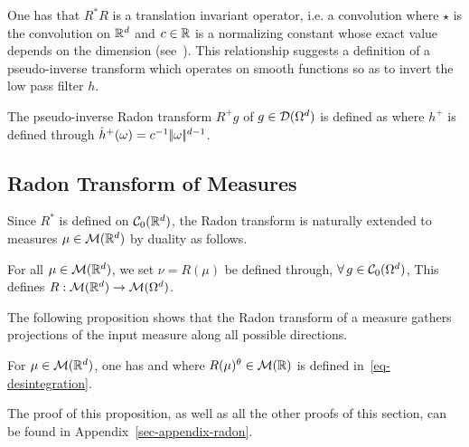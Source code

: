 \newcommand{\filt}{h}

One has that $R^* R$ is a translation invariant operator, i.e. a convolution  
\eq{
	R^*R f = \filt \star f
	\qwhereq
	\hat\filt(\om) = c \, \norm{\om}^{-(d-1)},
}
where $\star$ is the convolution on $\mathbb{R}^d$ and $c \in \mathbb{R}$ is a normalizing constant whose exact value depends on the dimension (see~\cite{Helgason-radonbook}). This relationship suggests a definition of a pseudo-inverse transform which operates on smooth functions so as to invert the low pass filter $\filt$.

\begin{defn} 
The pseudo-inverse Radon transform $R^+ g$ of $g \in \mathcal{D}(\Omega^d)$ is defined as
\eql{\label{eq-pseudo-inv}
	R^{+} g = \filt^+ \star (R^* g)
}
where $\filt^+$ is defined through $\hat \filt^+(\om) = c^{-1} \norm{\om}^{d-1}$.
\end{defn}



\subsection{Radon Transform of Measures}

Since $R^*$ is defined on $\mathcal{C}_0(\mathbb{R}^d)$, the Radon transform is naturally extended to measures $\mu \in \mathcal{M}(\mathbb{R}^d)$ by duality as follows.

\begin{defn}\label{defn-radon-measure} For all $\mu \in \mathcal{M}(\mathbb{R}^d)$, we set $\nu=R(\mu)$ be defined through, $\forall \, g \in \mathcal{C}_0(\Omega^d)$, 
This defines $R : \mathcal{M}(\mathbb{R}^d) \rightarrow \mathcal{M}(\Omega^d)$.
\end{defn}

The following proposition shows that the Radon transform of a measure gathers projections of the input measure along all possible directions.

\begin{prop}\label{prop-radon-pushforward}
For $\mu \in \mathcal{M}(\mathbb{R}^d)$, one has 
and where $R(\mu)^{\theta} \in \mathcal{M}(\mathbb{R})$ is defined in~\eqref{eq-desintegration}.
\end{prop}

The proof of this proposition, as well as all the other proofs of this section, can be found in Appendix~\ref{sec-appendix-radon}.



